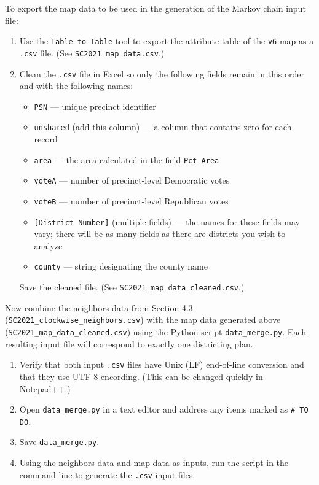 \documentclass[11pt]{article}
\begin{document}
To export the map data to be used in the generation of the Markov chain input file:
\begin{enumerate}
	\item Use the \verb|Table to Table| tool to export the attribute table of the \verb|v6| map as a \verb|.csv| file. (See \verb|SC2021_map_data.csv|.)
	\item Clean the \verb|.csv| file in Excel so only the following fields remain in this order and with the following names:
	\begin{itemize}
		\item \verb|PSN| --- unique precinct identifier
		\item \verb|unshared| (add this column) --- a column that contains zero for each record
		\item \verb|area| --- the area calculated in the field \verb|Pct_Area|
		\item \verb|voteA| --- number of precinct-level Democratic votes
		\item \verb|voteB| --- number of precinct-level Republican votes
		\item \verb|[District Number]| (multiple fields) --- the names for these fields may vary; there will be as many fields as there are districts you wish to analyze
		\item \verb|county| --- string designating the county name
	\end{itemize}
	Save the cleaned file. (See \verb|SC2021_map_data_cleaned.csv|.)\\
\end{enumerate}

Now combine the neighbors data from Section 4.3 (\verb|SC2021_clockwise_neighbors.csv|) with the map data generated above (\verb|SC2021_map_data_cleaned.csv|) using the Python script \verb|data_merge.py|. Each resulting input file will correspond to exactly one districting plan.
\begin{enumerate}
	\item Verify that both input \verb|.csv| files have Unix (LF) end-of-line conversion and that they use UTF-8 encording. (This can be changed quickly in Notepad++.)
	\item Open \verb|data_merge.py| in a text editor and address any items marked as \verb|# TO DO|.
	\item Save \verb|data_merge.py|.
	\item Using the neighbors data and map data as inputs, run the script in the command line to generate the \verb|.csv| input files.\\
\end{enumerate}
\end{document}
